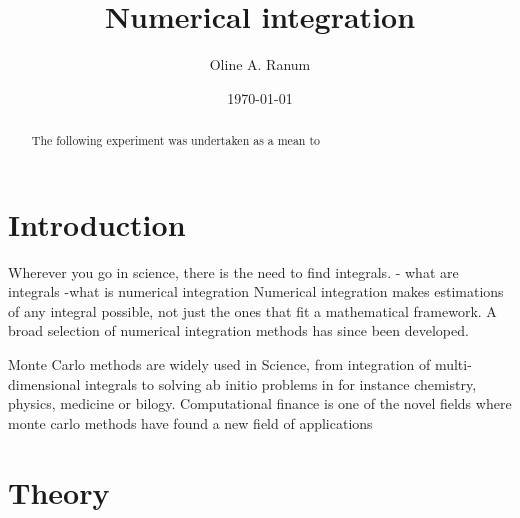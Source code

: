 \documentclass[%
reprint,
amsmath,amssymb,
aps,
]{revtex4-1}
\begin{document}
\title{Numerical integration}
\author{Oline A. Ranum}
\date{\today}


\begin{abstract}
	The following experiment was undertaken as a mean to 
\end{abstract}
\maketitle

\section{Introduction}
Wherever you go in science, there is the need to find integrals.
- what are integrals 
-what is numerical integration 
Numerical integration makes estimations  of any integral possible, not just the ones that fit a mathematical framework. 
A broad selection of numerical integration methods has since been developed. 

Monte Carlo methods are widely used in Science, from integration of multi-dimensional integrals to solving ab initio problems in for instance chemistry, physics, medicine or bilogy. Computational finance is one of the novel fields where monte carlo methods have found a new field of applications
\newpage 
\section{Theory}
\end{document}
